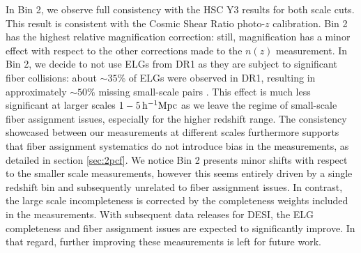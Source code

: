 In Bin 2, we observe full consistency with the HSC Y3 results for both scale cuts.
This result is consistent with the Cosmic Shear Ratio photo-$z$ \cite{Rana2025HSCY3CosmicShearRatios} calibration. 
Bin 2 has the highest relative magnification correction: still, magnification has a minor effect with respect to the other corrections made to the $n(z)$ measurement. 
In Bin 2, we decide to not use ELGs from DR1 as they are subject to significant fiber collisions: about $\sim35\%$ of ELGs were observed in DR1, resulting in approximately $\sim50\%$ missing small-scale pairs \cite{Pinon2025FiberAssign}.
This effect is much less significant at larger scales $1-5\,\mathrm{h}^{-1}\mathrm{Mpc}$ as we leave the regime of small-scale fiber assignment issues, especially for the higher redshift range. 
The consistency showcased between our measurements at different scales furthermore supports that fiber assignment systematics do not introduce bias in the measurements, as detailed in section \ref{sec:2pcf}. 
We notice Bin 2 presents minor shifts with respect to the smaller scale measurements, however this seems entirely driven by a single redshift bin and subsequently unrelated to fiber assignment issues. 
In contrast, the large scale incompleteness is corrected by the completeness weights included in the measurements. 
With subsequent data releases for DESI, the ELG completeness and fiber assignment issues are expected to significantly improve. 
In that regard, further improving these measurements is left for future work.

